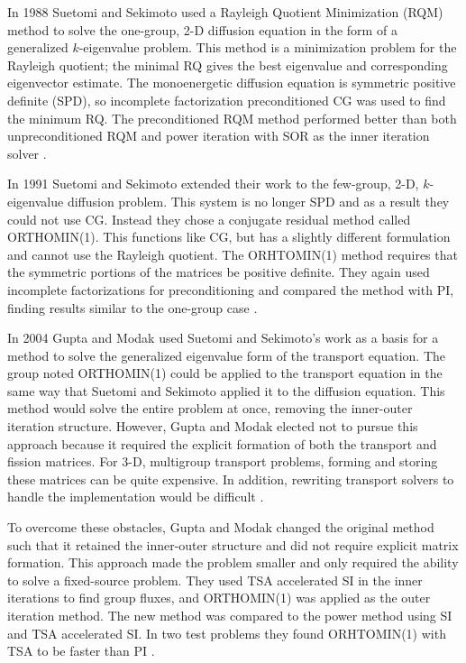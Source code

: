 In 1988 Suetomi and Sekimoto used a Rayleigh Quotient Minimization (RQM) method to solve the one-group, 2-D diffusion equation in the form of a generalized $k$-eigenvalue problem. This method is a minimization problem for the Rayleigh quotient; the minimal RQ gives the best eigenvalue and corresponding eigenvector estimate. The monoenergetic diffusion equation is symmetric positive definite (SPD), so incomplete factorization preconditioned CG was used to find the minimum RQ. The preconditioned RQM method performed better than both unpreconditioned RQM and power iteration with SOR as the inner iteration solver \cite{Suetomi1988}. 

In 1991 Suetomi and Sekimoto extended their work to the few-group, 2-D, $k$-eigenvalue diffusion problem. This system is no longer SPD and as a result they could not use CG. Instead they chose a conjugate residual method called ORTHOMIN(1). This functions like CG, but has a slightly different formulation and cannot use the Rayleigh quotient. The ORHTOMIN(1) method requires that the symmetric portions of the matrices be positive definite. They again used incomplete factorizations for preconditioning and compared the method with PI, finding results similar to the one-group case \cite{Suetomi1991}.  

In 2004 Gupta and Modak used Suetomi and Sekimoto's work as a basis for a method to solve the generalized eigenvalue form of the transport equation. The group noted ORTHOMIN(1) could be applied to the transport equation in the same way that Suetomi and Sekimoto applied it to the diffusion equation. This method would solve the entire problem at once, removing the inner-outer iteration structure. However, Gupta and Modak elected not to pursue this approach because it required the explicit formation of both the transport and fission matrices. For 3-D, multigroup transport problems, forming and storing these matrices can be quite expensive. In addition, rewriting transport solvers to handle the implementation would be difficult \cite{Gupta2004}.
 
To overcome these obstacles, Gupta and Modak changed the original method such that it retained the inner-outer structure and did not require explicit matrix formation. This approach made the problem smaller and only required the ability to solve a fixed-source problem. They used TSA accelerated SI in the inner iterations to find group fluxes, and ORTHOMIN(1) was applied as the outer iteration method. The new method was compared to the power method using SI and TSA accelerated SI. In two test problems they found ORHTOMIN(1) with TSA to be faster than PI \cite{Gupta2004}. 

